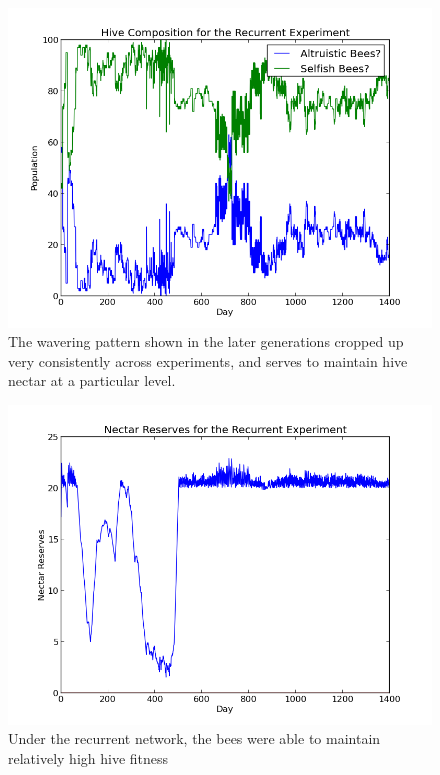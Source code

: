 \documentclass[11pt]{article}
\begin{document}
			\begin{figure}[tb]
				\begin{center}
					\includegraphics[scale=.75]{results/recurrent_comp.png}
				\end{center}
				\caption{The wavering pattern shown in the later generations cropped up very consistently across experiments, and serves to maintain hive nectar at a particular level.}
				\label{fig:recurrent_composition}
			\end{figure}

			\begin{figure}[tb]
				\begin{center}
					\includegraphics[scale=.75]{results/recurrent_res.png}
				\end{center}
				\caption{Under the recurrent network, the bees were able to maintain relatively high hive fitness}
				\label{fig:recurrent_reserves}
			\end{figure}
\end{document}
